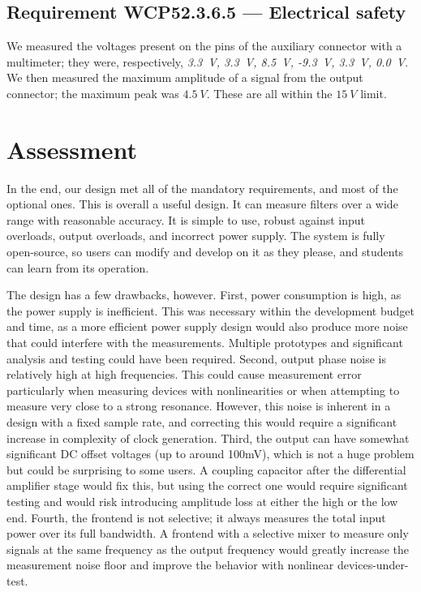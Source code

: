 \subsection*{Requirement WCP52.3.6.5 --- Electrical safety}
We measured the voltages present on the pins of the auxiliary connector with a multimeter;
they were, respectively, \emph{3.3~V, 3.3~V, 8.5~V, -9.3~V, 3.3~V, 0.0~V}. We then
measured the maximum amplitude of a signal from the output connector; the maximum peak was
$4.5~V$. These are all within the $15~V$ limit.

\section{Assessment}

In the end, our design met all of the mandatory requirements, and most of the optional ones.
This is overall a useful design. It can measure filters over a wide range with reasonable
accuracy. It is simple to use, robust against input overloads, output overloads, and incorrect
power supply. The system is fully open-source, so users can modify and develop on it as they
please, and students can learn from its operation.

The design has a few drawbacks, however. First, power consumption is high, as the power supply
is inefficient. This was necessary within the development budget and time, as a more efficient
power supply design would also produce more noise that could interfere with the measurements.
Multiple prototypes and significant analysis and testing could have been required. Second,
output phase noise is relatively high at high frequencies. This could cause measurement error
particularly when measuring devices with nonlinearities or when attempting to measure very close
to a strong resonance. However, this noise is inherent in a design with a fixed sample rate, and
correcting this would require a significant increase in complexity of clock generation. Third,
the output can have somewhat significant DC offset voltages (up to around 100mV), which is not
a huge problem but could be surprising to some users. A coupling capacitor after the differential
amplifier stage would fix this, but using the correct one would require significant testing and
would risk introducing amplitude loss at either the high or the low end. Fourth, the frontend
is not selective; it always measures the total input power over its full bandwidth. A frontend
with a selective mixer to measure only signals at the same frequency as the output frequency
would greatly increase the measurement noise floor and improve the behavior with nonlinear
devices-under-test.

